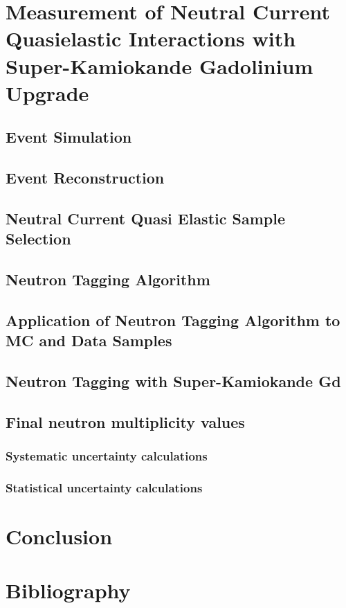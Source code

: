 \documentclass{article}
\begin{document}
\section{Measurement of Neutral Current Quasielastic Interactions with Super-Kamiokande Gadolinium Upgrade }

\subsection{Event Simulation}

\subsection{Event Reconstruction}

\subsection{Neutral Current Quasi Elastic Sample Selection}

\subsection{Neutron Tagging Algorithm}

\subsection{Application of Neutron Tagging Algorithm to MC and Data Samples}

\subsection{Neutron Tagging with Super-Kamiokande Gd}

\subsection{Final neutron multiplicity values}

\subsubsection{Systematic uncertainty calculations}

\subsubsection{Statistical uncertainty calculations}

\section{Conclusion}

\section{Bibliography}
\end{document}
